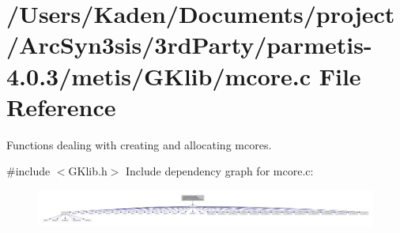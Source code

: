 \hypertarget{a00107}{}\section{/\+Users/\+Kaden/\+Documents/project/\+Arc\+Syn3sis/3rd\+Party/parmetis-\/4.0.3/metis/\+G\+Klib/mcore.c File Reference}
\label{a00107}


Functions dealing with creating and allocating mcores.  


{\ttfamily \#include $<$G\+Klib.\+h$>$}\newline
Include dependency graph for mcore.\+c\+:\nopagebreak
\begin{figure}[H]
\begin{center}
\leavevmode
\includegraphics[width=350pt]{a00108}
\end{center}
\end{figure}
